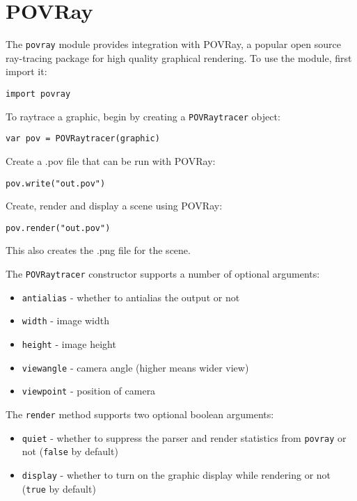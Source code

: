 \hypertarget{povray}{%
\section{POVRay}\label{povray}}

The \texttt{povray} module provides integration with POVRay, a popular
open source ray-tracing package for high quality graphical rendering. To
use the module, first import it:

\begin{lstlisting}
import povray
\end{lstlisting}

To raytrace a graphic, begin by creating a \texttt{POVRaytracer} object:

\begin{lstlisting}
var pov = POVRaytracer(graphic)
\end{lstlisting}

Create a .pov file that can be run with POVRay:

\begin{lstlisting}
pov.write("out.pov")
\end{lstlisting}

Create, render and display a scene using POVRay:

\begin{lstlisting}
pov.render("out.pov")
\end{lstlisting}

This also creates the .png file for the scene.

The \texttt{POVRaytracer} constructor supports a number of optional
arguments:

\begin{itemize}

\item
  \texttt{antialias} - whether to antialias the output or not
\item
  \texttt{width} - image width
\item
  \texttt{height} - image height
\item
  \texttt{viewangle} - camera angle (higher means wider view)
\item
  \texttt{viewpoint} - position of camera
\end{itemize}

The \texttt{render} method supports two optional boolean arguments:

\begin{itemize}

\item
  \texttt{quiet} - whether to suppress the parser and render statistics
  from \texttt{povray} or not (\texttt{false} by default)
\item
  \texttt{display} - whether to turn on the graphic display while
  rendering or not (\texttt{true} by default)
\end{itemize}
